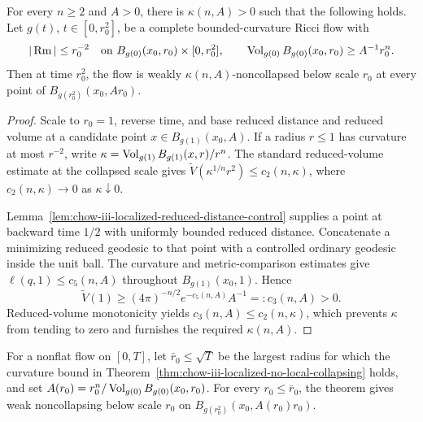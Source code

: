 \begin{theorem}
\label{thm:chow-iii-localized-no-local-collapsing}


For every \(n\ge2\) and \(A>0\), there is \(\kappa(n,A)>0\) such that the
following holds.  Let \(g(t)\), \(t\in[0,r_0^2]\), be a complete
bounded-curvature Ricci flow with
\[
 |\operatorname{Rm}|\le r_0^{-2}\quad\text{on }B_{g(0)}(x_0,r_0)\times[0,r_0^2],
 \qquad \operatorname{Vol}_{g(0)}B_{g(0)}(x_0,r_0)\ge A^{-1}r_0^n.
\]
Then at time \(r_0^2\), the flow is weakly \(\kappa(n,A)\)-noncollapsed below
scale \(r_0\) at every point of \(B_{g(r_0^2)}(x_0,Ar_0)\).
\end{theorem}
\begin{proof}
\sketch Scale to \(r_0=1\), reverse time, and base reduced distance and reduced volume
at a candidate point \(x\in B_{g(1)}(x_0,A)\).  If a radius \(r\le1\) has
curvature at most \(r^{-2}\), write
\(\kappa=\operatorname{Vol}_{g(1)}B_{g(1)}(x,r)/r^n\).  The standard reduced-volume estimate
at the collapsed scale gives
\(\widetilde V(\kappa^{1/n}r^2)\le c_2(n,\kappa)\), where
\(c_2(n,\kappa)\to0\) as \(\kappa\downarrow0\).

Lemma~\ref{lem:chow-iii-localized-reduced-distance-control} supplies a point
at backward time \(1/2\) with uniformly bounded reduced distance.  Concatenate
a minimizing reduced geodesic to that point with a controlled ordinary
geodesic inside the unit ball.  The curvature and metric-comparison estimates
give \(\ell(q,1)\le c_5(n,A)\) throughout \(B_{g(1)}(x_0,1)\).  Hence
\[
 \widetilde V(1)\ge(4\pi)^{-n/2}e^{-c_5(n,A)}A^{-1}=:c_3(n,A)>0.
\]
Reduced-volume monotonicity yields
\(c_3(n,A)\le c_2(n,\kappa)\), which prevents \(\kappa\) from tending to zero
and furnishes the required \(\kappa(n,A)\).
\end{proof}

\begin{remark}
\label{rem:chow-iii-localized-noncollapsing-maximal-scale}


For a nonflat flow on \([0,T]\), let \(\bar r_0\le\sqrt T\) be the largest
radius for which the curvature bound in
Theorem~\ref{thm:chow-iii-localized-no-local-collapsing} holds, and set
\(A(r_0)=r_0^n/\operatorname{Vol}_{g(0)}B_{g(0)}(x_0,r_0)\).  For every
\(r_0\le\bar r_0\), the theorem gives weak noncollapsing below scale \(r_0\)
on \(B_{g(r_0^2)}(x_0,A(r_0)r_0)\).
\end{remark}

